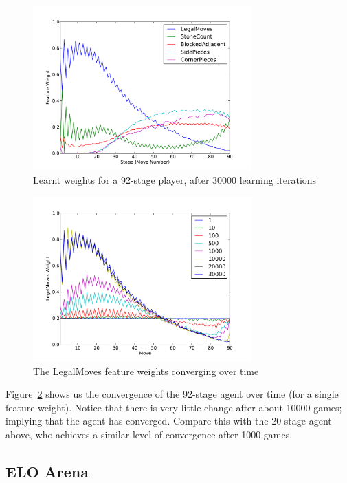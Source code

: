 \documentclass[11pt]{article}
\begin{document}
\begin{figure}[htbp]
  \centering
  \includegraphics[trim=0cm 0cm 1.5cm 1cm, clip, width=0.75\textwidth]
    {../Graphs/finalweights.pdf}
  \caption{Learnt weights for a 92-stage player, after 30000 learning iterations}
  \label{WeightsOverTime92}
\end{figure}


\begin{figure}[H]
  \centering
  \includegraphics[trim=0cm 0cm 1.5cm 1cm, clip, width=0.75\textwidth]
    {../Graphs/legalmovesprogression.pdf}
  \caption{The LegalMoves feature weights converging over time}
  \label{LegalMovesConvergence}
\end{figure}

Figure~\ref{LegalMovesConvergence} shows us the convergence of the 92-stage agent
over time (for a single feature weight). Notice that there is very little
change after about 10000 games; implying that the agent has converged. Compare this
with the 20-stage agent above, who achieves a similar level of convergence after 1000
games.


\subsection{ELO Arena}
\label{sub:elo_arena}
\end{document}
